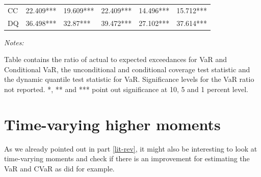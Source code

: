\documentclass[a4paper, nobind]{templates/ociamthesis}
\begin{document}
\begin{table}
\begin{threeparttable}
\begin{tabular}[t]{llllll}
\hspace{1em}\hspace{1em}CC & 22.409*** & 19.609*** & 22.409*** & 14.496*** & 15.712***\\
\hspace{1em}\hspace{1em}DQ & 36.498*** & 32.87*** & 39.472*** & 27.102*** & 37.614***\\
\bottomrule
\end{tabular}
\begin{tablenotes}
\item \textit{Notes:} 
\item Table contains the ratio of actual to expected exceedances for VaR and Conditional VaR, the unconditional and conditional coverage test statistic and the dynamic quantile test statistic for VaR. Significance levels for the VaR ratio not reported. *, ** and *** point out significance at 10, 5 and 1 percent level.
\end{tablenotes}
\end{threeparttable}
\end{table}

\clearpage

\hypertarget{time-varying-higher-moments}{%
\section{Time-varying higher moments}\label{time-varying-higher-moments}}

As we already pointed out in part \ref{lit-rev}, it might also be interesting to look at time-varying moments and check if there is an improvement for estimating the VaR and CVaR as \textcite{bali2008} did for example.
\end{document}
